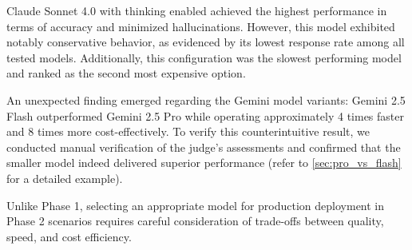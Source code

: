 Claude Sonnet 4.0 with thinking enabled achieved the highest performance in terms of accuracy and minimized hallucinations. However, this model exhibited notably conservative behavior, as evidenced by its lowest response rate among all tested models.
Additionally, this configuration was the slowest performing model and ranked as the second most expensive option.

An unexpected finding emerged regarding the Gemini model variants: Gemini 2.5 Flash outperformed Gemini 2.5 Pro while operating approximately 4 times faster and 8 times more cost-effectively. To verify this counterintuitive result, we conducted manual verification of the judge's assessments and confirmed that the smaller model indeed delivered superior performance (refer to \cref{sec:pro_vs_flash} for a detailed example).

Unlike Phase 1, selecting an appropriate model for production deployment in Phase 2 scenarios requires careful consideration of trade-offs between quality, speed, and cost efficiency.

